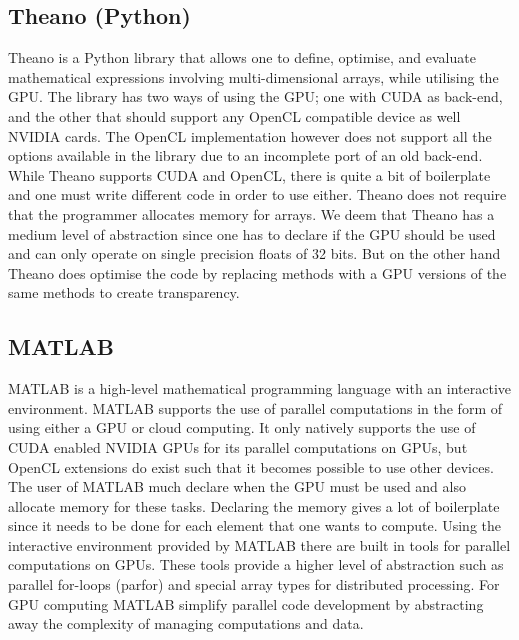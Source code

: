 \subsection{Theano (Python)}
Theano is a Python library that allows one to define, optimise, and evaluate mathematical expressions involving multi-dimensional arrays, while utilising the GPU.
The library has two ways of using the GPU; one with CUDA as back-end, and the other that should support any OpenCL compatible device as well NVIDIA cards.
The OpenCL implementation however does not support all the options available in the library due to an incomplete port of an old back-end.
While Theano supports CUDA and OpenCL, there is quite a bit of boilerplate and one must write different code in order to use either.
Theano does not require that the programmer allocates memory for arrays.
We deem that Theano has a medium level of abstraction since one has to declare if the GPU should be used and can only operate on single precision floats of 32 bits.
But on the other hand Theano does optimise the code by replacing methods with a GPU versions of the same methods to create transparency.\citep{Theano,Theano_GPU}

\subsection{MATLAB}
MATLAB is a high-level mathematical programming language with an interactive environment.
MATLAB supports the use of parallel computations in the form of using either a GPU or cloud computing.
It only natively supports the use of CUDA enabled NVIDIA GPUs for its parallel computations on GPUs, but OpenCL extensions do exist such that it becomes possible to use other devices.
The user of MATLAB much declare when the GPU must be used and also allocate memory for these tasks.
Declaring the memory gives a lot of boilerplate since it needs to be done for each element that one wants to compute.\citep{MATLAB_backend,MATLAB_benchmark,}
Using the interactive environment provided by MATLAB there are built in tools for parallel computations on GPUs.
These tools provide a higher level of abstraction such as parallel for-loops (parfor) and special array types for distributed processing.
For GPU computing MATLAB simplify parallel code development by abstracting away the complexity of managing computations and data.\citep{MATLAB_parallel}

